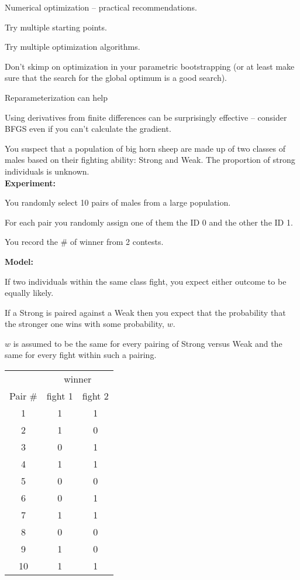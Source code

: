 \documentclass[landscape]{foils}
\begin{document}
\myNewSlide
\Large
Numerical optimization -- practical recommendations.
\begin{compactenum}
  \item Try multiple starting points.
  \item Try multiple optimization algorithms.
  \item Don't skimp on optimization in your parametric bootstrapping (or at least make sure that the search for the global optimum is a good search).
  \item Reparameterization can help
  \item Using derivatives from finite differences can be surprisingly effective -- consider BFGS even if you can't calculate the gradient.
\end{compactenum}


\myNewSlide
\normalsize
You suspect that a population of big horn sheep are made up of two classes of males based on their fighting ability: Strong and Weak. The proportion of strong individuals is unknown.\\ {\bf Experiment:}
\begin{compactitem}
  \item You randomly select 10 pairs of males from a large population. 
  \item For each pair you randomly assign one of them the ID 0 and the other the ID 1.  
  \item You record the \# of winner from 2 contests.
\end{compactitem}
{\bf Model:}
\begin{compactitem}
  \item If two individuals within the same class fight, you expect either outcome to be equally likely.
  \item If a Strong is paired against a Weak then you expect that the probability that the stronger one wins with some probability, $w$.
  \item $w$ is assumed to be the same for every pairing of Strong {versus} Weak and the same for every fight within such a pairing.
\end{compactitem}

\myNewSlide
\begin{center}
\begin{tabular}{|c|c|c|}
\hline
& \multicolumn{2}{c|}{winner}\\
Pair \# & fight 1 & fight 2 \\
\hline
1 & 1 & 1  \\
\hline
2 & 1 & 0  \\
\hline
3 & 0 & 1  \\
\hline
4 & 1 & 1  \\
\hline
5 & 0 & 0  \\
\hline
6 & 0 & 1   \\
\hline
7 & 1 & 1  \\
\hline
8 & 0 & 0  \\
\hline
9 & 1 & 0  \\
\hline
10 & 1 & 1   \\
\hline
\end{tabular}
\end{center}
\end{document}
